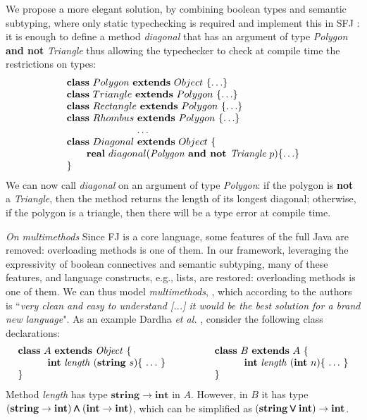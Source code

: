 \documentclass[runningheads]{llncs}
\begin{document}
\begin{example}[Polygons]
We propose a more elegant solution, by combining boolean types and semantic subtyping, where only static typechecking is required and implement this in SFJ \cite{UD20}: it is enough to define a method \emph{diagonal} that has an argument of type \emph{Polygon} \textbf{and not} \emph{Triangle} thus allowing the typechecker to check at compile time the restrictions on types:
$$
\begin{array}{l}
\mathbf{class} \  Polygon \ \mathbf{extends }\  Object\ \{\ldots\}
\\
\mathbf{class} \  Triangle \ \mathbf{extends }\  Polygon\ \{\ldots\}
\\
\mathbf{class} \  Rectangle \ \mathbf{extends }\  Polygon\ \{\ldots\}
\\
\mathbf{class} \  Rhombus \ \mathbf{extends }\  Polygon\ \{\ldots\}
\\
\hspace{2.5cm} \ldots
\\
\mathbf{class} \  Diagonal \ \mathbf{extends }\  Object\ \{
	\\
	\qquad \mathbf{real}\ diagonal(\textit{Polygon} \textbf{ and not }  \textit{Triangle} \ p)\{\ldots\}
	\\
\}
\end{array}
$$
We can now call \emph{diagonal} on an argument of type \emph{Polygon}: if the polygon is \textbf{not} a \emph{Triangle}, then the method returns the length of its longest diagonal; otherwise, if the polygon is a triangle, then there will be a type error at compile time.
\end{example}
\emph{On multimethods}
Since FJ is a core language, some features of the full Java are removed: overloading methods is one of them.
In our framework, leveraging the expressivity of boolean connectives and semantic subtyping, many of these features, and language constructs, e.g., lists, are restored: overloading methods is one of them. We can thus model \emph{multimethods}, \cite{BC97}, which according to the authors is ``\emph{very clean and easy to understand [...] it would be the best solution for a brand new language}".
As an example Dardha \emph{et al.}  \cite{Dardha2013,Dardha2017}, consider the following class declarations:
$$
\begin{array}{ll}
\mathbf{class} \  A \ \mathbf{extends }\  \mathit{Object}\ \{
&
\qquad
\mathbf{class} \  B \ \mathbf{extends }\  A\ \{
\\
	\qquad\quad \mathbf{int}\ \mathit{length}\ (\mathbf{string}\ s)\{\ \ldots\ \}\qquad
&
	\qquad\qquad\quad \mathbf{int}\ \mathit{length}\ (\mathbf{int}\ n)\{\ \ldots\ \}
\\
\}
&
\qquad \}
\end{array}
$$
Method {\it length} has type $\mathbf{string} \rightarrow \mathbf{int}$ in $A$. However, in $B$ it has type $(\mathbf{string} \rightarrow \mathbf{int}) \pmb{\wedge} (\mathbf{int} \rightarrow \mathbf{int})$,
which can be simplified as $(\mathbf{string} \pmb{\vee} \mathbf{int}) \rightarrow \mathbf{int}$.
\end{document}
